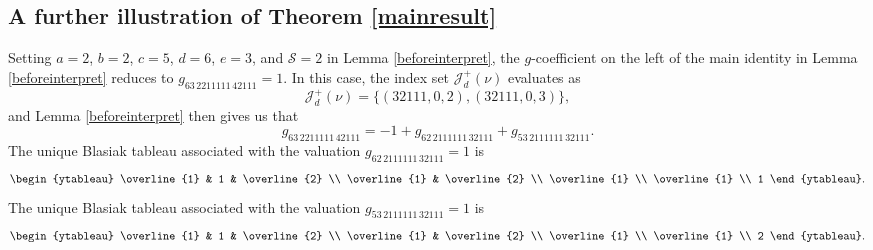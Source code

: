 \documentclass[12pt]{article}
\begin{document}
 \subsection{A further illustration of Theorem \ref{mainresult}}\label{Appendfurther}
 Setting $a = 2$, $b = 2$, $c = 5$, $d =6$, $e = 3$, and $\mathcal{S} = 2$ in Lemma \ref{beforeinterpret}, the $g$-coefficient on the 
 left of the main identity in Lemma \ref{beforeinterpret} reduces to $g_{ 63 \, 2211111 \, 42111 } = 1$. In this case, the index set
 $\mathcal{J}_{d}^{+}(\nu)$ evaluates as $$ \mathcal{J}_{d}^{+}(\nu) = \big\{ (32111, 0, 2), (32111, 0, 3) \big\}, $$ and Lemma 
 \ref{beforeinterpret} then gives us that $$g_{ 63 \, 2211111 \, 42111 } = -1 + g_{62 \, 2111111 \, 32111} + g_{53 \, 2111111 \, 
 32111}. $$ The unique Blasiak tableau associated with the valuation $g_{62 \, 2111111 \, 32111} = 1$ is $$ \begin{ytableau} 
 \overline{1} & 1 & \overline{2} \\ \overline{1} & \overline{2} \\ \overline{1} \\ \overline{1} \\ 1 \end{ytableau}. $$ The unique Blasiak 
 tableau associated with the valuation $ g_{53 \, 2111111 \, 32111} = 1$ is $$ \begin{ytableau} \overline{1} & 1 & \overline{2} \\ 
 \overline{1} & \overline{2} \\ \overline{1} \\ \overline{1} \\ 2 \end{ytableau}. $$ 



\end{document}
